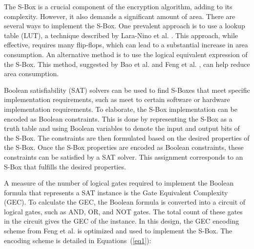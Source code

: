 \documentclass[final,5p,times,twocolumn]{elsarticle}
\begin{document}
The S-Box is a crucial component of the encryption algorithm, adding to its complexity.
However, it also demands a significant amount of area.
There are several ways to implement the S-Box.
One prevalent approach is to use a lookup table (LUT), a technique described by Lara-Nino et al. \cite{LaraNino2017}.
This approach, while effective, requires many flip-flops, which can lead to a substantial increase in area consumption.
An alternative method is to use the logical equivalent expression of the S-Box.
This method, suggested by Bao et al. \cite{bao2019peigen} and Feng et al. \cite{Feng2023}, can help reduce area consumption.

Boolean satisfiability (SAT) solvers can be used to find S-Boxes that meet specific implementation requirements, such as meet to certain software or hardware implementation requirements.
To elaborate, the S-Box implementation can be encoded as Boolean constraints.
This is done by representing the S-Box as a truth table and using Boolean variables to denote the input and output bits of the S-Box.
The constraints are then formulated based on the desired properties of the S-Box.
Once the S-Box properties are encoded as Boolean constraints, these constraints can be satisfied by a SAT solver.
This assignment corresponds to an S-Box that fulfills the desired properties.

A measure of the number of logical gates required to implement the Boolean formula that represents a SAT instance is the Gate Equivalent Complexity (GEC).
To calculate the GEC, the Boolean formula is converted into a circuit of logical gates, such as AND, OR, and NOT gates.
The total count of these gates in the circuit gives the GEC of the instance.
In this design, the GEC encoding scheme from Feng et al. \cite{Feng2023} is optimized and used to implement the S-Box.
The encoding scheme is detailed in Equations~(\ref{eq1}):



\end{document}
